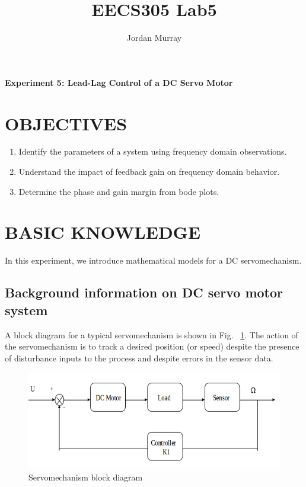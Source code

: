 \documentclass[11pt,a4paper]{article}
\author{Jordan Murray}
\title{EECS305 Lab5}
\begin{document}
\begin{center}
\fontsize{24}{12}\selectfont
\textbf{Experiment 5: Lead-Lag Control of a DC Servo Motor}
\end{center}
\section{OBJECTIVES}

\begin{enumerate}
\item Identify the parameters of a system using frequency domain observations.

\item Understand the impact of feedback gain on frequency domain behavior.

\item Determine the phase and gain margin from bode plots.

\end{enumerate}


\section{BASIC KNOWLEDGE}
In this experiment, we introduce mathematical models for a DC servomechanism.

\subsection{Background information on DC servo motor system}

A block diagram for a typical servomechanism is shown in Fig. ~\ref{fig:servoblock}.  The action of the servomechanism is to track a desired position (or speed) despite the 
presence of disturbance inputs to the process and despite errors in the 
sensor data.

\begin{figure}[here]
\includegraphics[width=\textwidth]{imglab/servoblockdiagram.png}
\caption{Servomechanism block diagram}
\label{fig:servoblock}
\end{figure}
\end{document}

